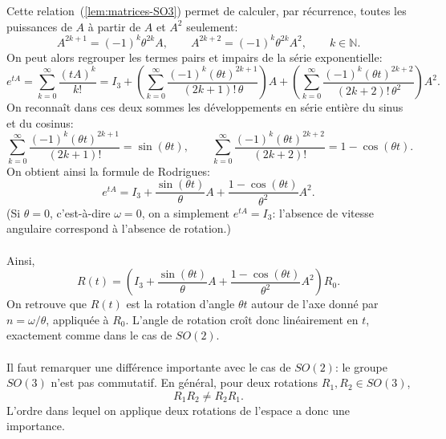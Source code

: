 \documentclass[12pt]{report}
\begin{document}
Cette relation~(\ref{lem:matrices-SO3}) permet de calculer, par récurrence, toutes les puissances de $A$ à partir de $A$ et $A^2$ seulement:
\[
A^{2k+1}={(-1)}^k\theta^{2k}A,\qquad A^{2k+2}={(-1)}^k\theta^{2k}A^2,\qquad k\in\mathbb{N}.
\]
On peut alors regrouper les termes pairs et impairs de la série exponentielle:
\[
e^{tA}=\sum_{k=0}^{\infty}\frac{{(tA)}^k}{k!}=I_3+\left(\sum_{k=0}^{\infty}\frac{{(-1)}^k{(\theta t)}^{2k+1}}{(2k+1)!\,\theta}\right)A+\left(\sum_{k=0}^{\infty}\frac{{(-1)}^k{(\theta t)}^{2k+2}}{(2k+2)!\,\theta^2}\right)A^2.
\]
On reconnaît dans ces deux sommes les développements en série entière du sinus et du cosinus:
\[
\sum_{k=0}^{\infty}\frac{{(-1)}^k{(\theta t)}^{2k+1}}{(2k+1)!}=\sin(\theta t),\qquad \sum_{k=0}^{\infty}\frac{{(-1)}^k{(\theta t)}^{2k+2}}{(2k+2)!}=1-\cos(\theta t).
\]
On obtient ainsi la formule de Rodrigues:
\[
e^{tA}=I_3+\frac{\sin(\theta t)}{\theta}A+\frac{1-\cos(\theta t)}{\theta^2}A^2.
\]
(Si $\theta=0$, c'est-à-dire $\omega=0$, on a simplement $e^{tA}=I_3$: l'absence de vitesse angulaire correspond à l'absence de rotation.)\\\\
Ainsi,
\[
R(t)=\left(I_3+\frac{\sin(\theta t)}{\theta}A+\frac{1-\cos(\theta t)}{\theta^2}A^2\right)R_0.
\]
On retrouve que $R(t)$ est la rotation d'angle $\theta t$ autour de l'axe donné par $n=\omega/\theta$, appliquée à $R_0$. L'angle de rotation croît donc linéairement en $t$, exactement comme dans le cas de $SO(2)$.\\\\
Il faut remarquer une différence importante avec le cas de $SO(2)$: le groupe $SO(3)$ n'est pas commutatif. En général, pour deux rotations $R_1,R_2\in SO(3)$,
\[
R_1R_2\neq R_2R_1.
\]
L'ordre dans lequel on applique deux rotations de l'espace a donc une importance.
\end{document}
